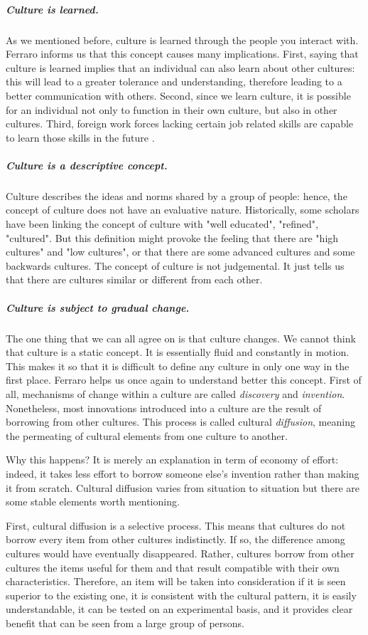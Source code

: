 \documentclass[../main.tex]{subfiles}
\begin{document}
\subparagraph*{Culture is learned.} As we mentioned before, culture is learned through the people you interact with. Ferraro informs us that this concept causes many implications. First, saying that culture is learned implies that an individual can also learn about other cultures: this will lead to a greater tolerance and understanding, therefore leading to a better communication with others. Second, since we learn culture, it is possible for an individual not only to function in their own culture, but also in other cultures. Third, foreign work forces lacking certain job related skills are capable to learn those skills in the future \autocite[19]{ferraro}.

\subparagraph*{Culture is a descriptive concept.} Culture describes the ideas and norms shared by a group of people: hence, the concept of culture does not have an evaluative nature. Historically, some scholars have been linking the concept of culture with "well educated", "refined", "cultured". But this definition might provoke the feeling that there are "high cultures" and "low cultures", or that there are some advanced cultures and some backwards cultures. The concept of culture is not judgemental. It just tells us that there are cultures similar or different from each other.

\subparagraph*{Culture is subject to gradual change.} The one thing that we can all agree on is that culture changes. We cannot think that culture is a static concept.
It is essentially fluid and constantly in motion. This makes it so that it is difficult to define any culture in only one way in the first place. Ferraro \autocite*[25-29]{ferraro} helps us once again to understand better this concept. First of all, mechanisms of change within a culture are called \textit{discovery} and \textit{invention}. Nonetheless, most innovations introduced into a culture are the result of borrowing from other cultures. This process is called cultural \textit{diffusion}, meaning the permeating of cultural elements from one culture to another.

Why this happens? It is merely an explanation in term of economy of effort: indeed, it takes less effort to borrow someone else's invention rather than making it from scratch. Cultural diffusion varies from situation to situation but there are some stable elements worth mentioning.

First, cultural diffusion is a selective process. This means that cultures do not borrow every item from other cultures indistinctly. If so, the difference among cultures would have eventually disappeared. Rather, cultures borrow from other cultures the items useful for them and that result compatible with their own characteristics. Therefore, an item will be taken into consideration if it is seen superior to the existing one, it is consistent with the cultural pattern, it is easily understandable, it can be tested on an experimental basis, and it provides clear benefit that can be seen from a large group of persons.
\end{document}
